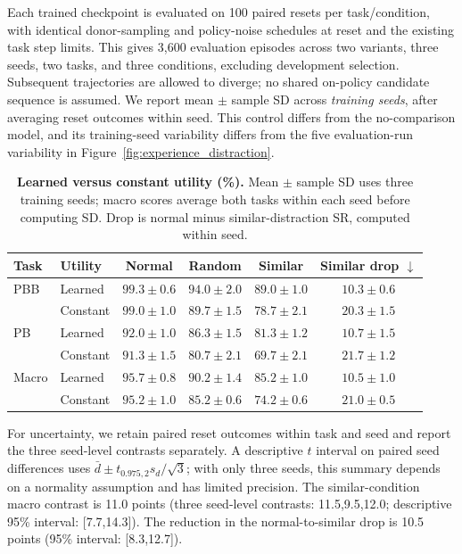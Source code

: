 Each trained checkpoint is evaluated on 100 paired resets per task/condition, with identical donor-sampling and policy-noise schedules at reset and the existing task step limits.
This gives 3,600 evaluation episodes across two variants, three seeds, two tasks, and three conditions, excluding development selection.
Subsequent trajectories are allowed to diverge; no shared on-policy candidate sequence is assumed.
We report mean $\pm$ sample SD across \emph{training seeds}, after averaging reset outcomes within seed.
This control differs from the no-comparison model, and its training-seed variability differs from the five evaluation-run variability in Figure~\ref{fig:experience_distraction}.

\begin{table}[H]
\centering\small
\setlength{\tabcolsep}{4pt}
\caption{\textbf{Learned versus constant utility (\%).}
Mean $\pm$ sample SD uses three training seeds; macro scores average both tasks within each seed before computing SD.
Drop is normal minus similar-distraction SR, computed within seed.}
\label{tab:rebuttal_constant_gate}
\begin{tabular}{@{}llcccc@{}}
\toprule
Task & Utility & Normal & Random & Similar & Similar drop $\downarrow$ \\
\midrule
PBB & Learned & $99.3\pm0.6$ & $94.0\pm2.0$ & $89.0\pm1.0$ & $10.3\pm0.6$ \\
 & Constant & $99.0\pm1.0$ & $89.7\pm1.5$ & $78.7\pm2.1$ & $20.3\pm1.5$ \\
PB & Learned & $92.0\pm1.0$ & $86.3\pm1.5$ & $81.3\pm1.2$ & $10.7\pm1.5$ \\
 & Constant & $91.3\pm1.5$ & $80.7\pm2.1$ & $69.7\pm2.1$ & $21.7\pm1.2$ \\
\midrule
Macro & Learned & $95.7\pm0.8$ & $90.2\pm1.4$ & $85.2\pm1.0$ & $10.5\pm1.0$ \\
 & Constant & $95.2\pm1.0$ & $85.2\pm0.6$ & $74.2\pm0.6$ & $21.0\pm0.5$ \\
\bottomrule
\end{tabular}
\end{table}

For uncertainty, we retain paired reset outcomes within task and seed and report the three seed-level contrasts separately.
A descriptive $t$ interval on paired seed differences uses $\bar d\pm t_{0.975,2}s_d/\sqrt3$; with only three seeds, this summary depends on a normality assumption and has limited precision.
The similar-condition macro contrast is 11.0 points (three seed-level contrasts: 11.5,9.5,12.0; descriptive 95\% interval: [7.7,14.3]).
The reduction in the normal-to-similar drop is 10.5 points (95\% interval: [8.3,12.7]).

